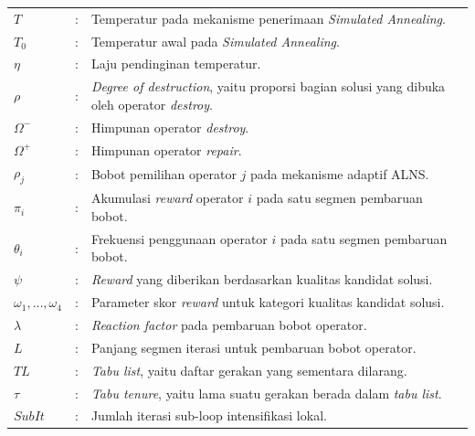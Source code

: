 \documentclass{file/TA-ITS}
\theoremstyle{definition}
\theoremstyle{definition}
\theoremstyle{plain}
\begin{document}
\begin{flushleft}
\begin{longtable}{@{}p{}p{}p{}@{}}
$T$ &:& Temperatur pada mekanisme penerimaan \textit{Simulated Annealing}. \\
$T_0$ &:& Temperatur awal pada \textit{Simulated Annealing}. \\
$\eta$ &:& Laju pendinginan temperatur. \\
$\rho$ &:& \textit{Degree of destruction}, yaitu proporsi bagian solusi yang dibuka oleh operator \textit{destroy}. \\
$\Omega^-$ &:& Himpunan operator \textit{destroy}. \\
$\Omega^+$ &:& Himpunan operator \textit{repair}. \\
$\rho_j$ &:& Bobot pemilihan operator $j$ pada mekanisme adaptif ALNS. \\
$\pi_i$ &:& Akumulasi \textit{reward} operator $i$ pada satu segmen pembaruan bobot. \\
$\theta_i$ &:& Frekuensi penggunaan operator $i$ pada satu segmen pembaruan bobot. \\
$\psi$ &:& \textit{Reward} yang diberikan berdasarkan kualitas kandidat solusi. \\
$\omega_1,\ldots,\omega_4$ &:& Parameter skor \textit{reward} untuk kategori kualitas kandidat solusi. \\
$\lambda$ &:& \textit{Reaction factor} pada pembaruan bobot operator. \\
$L$ &:& Panjang segmen iterasi untuk pembaruan bobot operator. \\
$TL$ &:& \textit{Tabu list}, yaitu daftar gerakan yang sementara dilarang. \\
$\tau$ &:& \textit{Tabu tenure}, yaitu lama suatu gerakan berada dalam \textit{tabu list}. \\
$SubIt$ &:& Jumlah iterasi sub-loop intensifikasi lokal. \\[0.35cm]


\end{longtable}
\end{flushleft}
\end{document}
